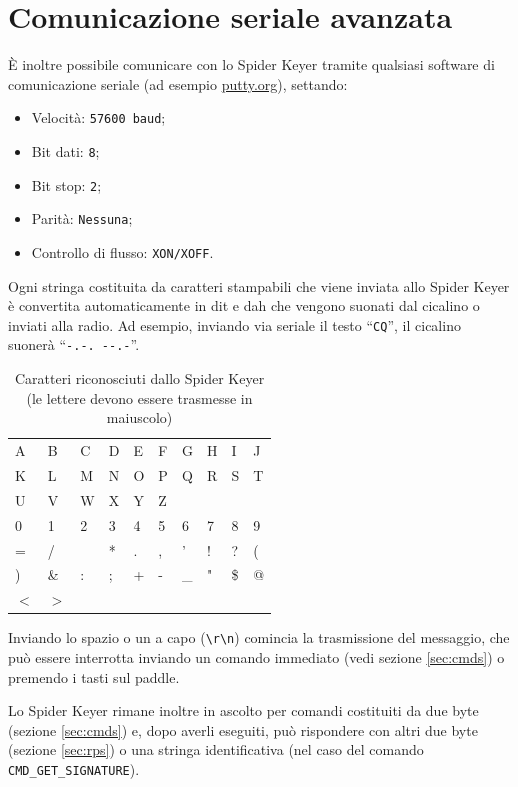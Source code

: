 \section{Comunicazione seriale avanzata}
\`E inoltre possibile comunicare con lo Spider Keyer tramite qualsiasi software di comunicazione seriale (ad esempio \url{putty.org}), settando:
\begin{itemize}
	\item Velocit\`a: \texttt{57600 baud};
	\item Bit dati: \texttt{8};
	\item Bit stop: \texttt{2};
	\item Parit\`a: \texttt{Nessuna};
	\item Controllo di flusso: \texttt{XON/XOFF}.
\end{itemize}

Ogni stringa costituita da caratteri stampabili che viene inviata allo Spider Keyer \`e convertita automaticamente in dit e dah che vengono suonati dal cicalino o inviati alla radio. Ad esempio, inviando via seriale il testo ``\texttt{CQ}'', il cicalino suoner\`a ``\texttt{-.-. -\--.-}''.

\begin{table}[h!]
	\begin{center}
		\begin{tabular}{llllllllll}		
			A&B&C&D&E&F&G&H&I&J\\
			K&L&M&N&O&P&Q&R&S&T\\
			U&V&W&X&Y&Z&&&&\\
			0&1&2&3&4&5&6&7&8&9\\
			=&/& &*&.&,&'&!&?&(\\
			)&\&&:&;&+&-&\_&"&\$&@\\
			$<$&$>$&&&&&&&&\\
			\end{tabular}
	\end{center}
	\caption{Caratteri riconosciuti dallo Spider Keyer (le lettere devono essere trasmesse in maiuscolo)}
	\label{tab:0}
\end{table}

Inviando lo spazio o un a capo (\texttt{\textbackslash r\textbackslash n}) comincia la trasmissione del messaggio, che pu\`o essere interrotta inviando un comando immediato (vedi sezione \ref{sec:cmds}) o premendo i tasti sul paddle.


Lo Spider Keyer rimane inoltre in ascolto per comandi costituiti da due byte (sezione \ref{sec:cmds}) e, dopo averli eseguiti, pu\`o rispondere con altri due byte (sezione \ref{sec:rps}) o una stringa identificativa (nel caso del comando \texttt{CMD\_GET\_SIGNATURE}).

